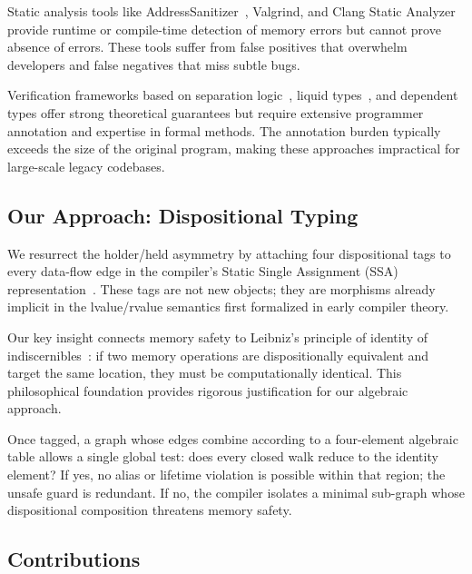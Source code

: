 \documentclass[acmsmall,anonymous,review,screen]{acmart}
\begin{document}
	Static analysis tools like AddressSanitizer~\cite{serebryany2012addresssanitizer}, Valgrind, and Clang Static Analyzer provide runtime or compile-time detection of memory errors but cannot prove absence of errors. These tools suffer from false positives that overwhelm developers and false negatives that miss subtle bugs.
	
	Verification frameworks based on separation logic~\cite{reynolds2002separation}, liquid types~\cite{rondon2008liquid}, and dependent types offer strong theoretical guarantees but require extensive programmer annotation and expertise in formal methods. The annotation burden typically exceeds the size of the original program, making these approaches impractical for large-scale legacy codebases.
	
	\subsection{Our Approach: Dispositional Typing}
	
	We resurrect the holder/held asymmetry by attaching four dispositional tags to every data-flow edge in the compiler's Static Single Assignment (SSA) representation~\cite{cytron1991efficiently}. These tags are not new objects; they are morphisms already implicit in the lvalue/rvalue semantics first formalized in early compiler theory.
	
	Our key insight connects memory safety to Leibniz's principle of identity of indiscernibles~\cite{leibniz1989philosophical}: if two memory operations are dispositionally equivalent and target the same location, they must be computationally identical. This philosophical foundation provides rigorous justification for our algebraic approach.
	
	Once tagged, a graph whose edges combine according to a four-element algebraic table allows a single global test: does every closed walk reduce to the identity element? If yes, no alias or lifetime violation is possible within that region; the unsafe guard is redundant. If no, the compiler isolates a minimal sub-graph whose dispositional composition threatens memory safety.
	
	\subsection{Contributions}
	
\end{document}
